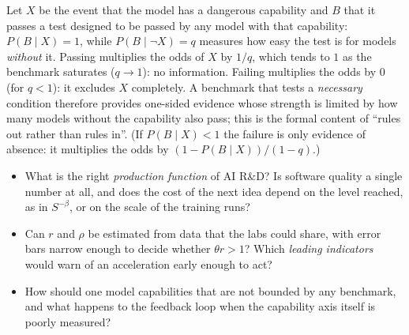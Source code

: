 \begin{beyond}
Let $X$ be the event that the model has a dangerous capability and $B$ that it passes a test designed to be passed by any model with that capability: $P(B\mid X)=1$, while $P(B\mid\neg X)=q$ measures how easy the test is for models \emph{without} it. Passing multiplies the odds of $X$ by $1/q$, which tends to $1$ as the benchmark saturates ($q\to1$): no information. Failing multiplies the odds by $0$ (for $q<1$): it excludes $X$ completely. A benchmark that tests a \emph{necessary} condition therefore provides one-sided evidence whose strength is limited by how many models without the capability also pass; this is the formal content of ``rules out rather than rules in''. (If $P(B\mid X)<1$ the failure is only evidence of absence: it multiplies the odds by $(1-P(B\mid X))/(1-q)$.)
\end{beyond}

\begin{openq}
\begin{itemize}
  \item What is the right \emph{production function} of AI R\&D? Is software quality a single number at all, and does the cost of the next idea depend on the level reached, as in $S^{-\beta}$, or on the scale of the training runs?
  \item Can $r$ and $\rho$ be estimated from data that the labs could share, with error bars narrow enough to decide whether $\theta r>1$? Which \emph{leading indicators} would warn of an acceleration early enough to act?
  \item How should one model capabilities that are not bounded by any benchmark, and what happens to the feedback loop when the capability axis itself is poorly measured?
\end{itemize}
\end{openq}


